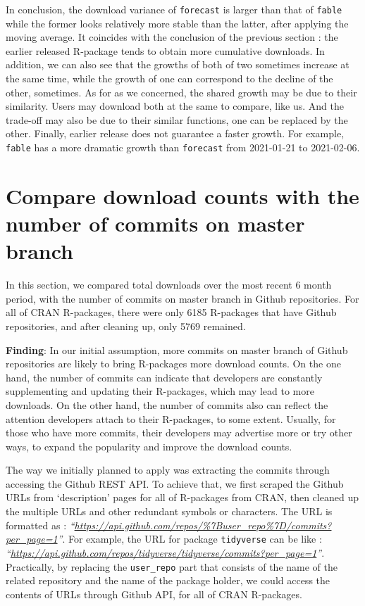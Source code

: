 \documentclass[
]{book}
\newenvironment{discovery}[1]{%
  \begin{tcolorbox}[colback=blue!30,colframe=blue!80!black]#1}{\end{tcolorbox}}
\begin{document}
In conclusion, the download variance of \texttt{forecast} is larger than that of \texttt{fable} while the former looks relatively more stable than the latter, after applying the moving average. It coincides with the conclusion of the previous section : the earlier released R-package tends to obtain more cumulative downloads. In addition, we can also see that the growths of both of two sometimes increase at the same time, while the growth of one can correspond to the decline of the other, sometimes. As for as we concerned, the shared growth may be due to their similarity. Users may download both at the same to compare, like us. And the trade-off may also be due to their similar functions, one can be replaced by the other. Finally, earlier release does not guarantee a faster growth. For example, \texttt{fable} has a more dramatic growth than \texttt{forecast} from 2021-01-21 to 2021-02-06.

\hypertarget{compare-download-counts-with-the-number-of-commits-on-master-branch}{%
\section{Compare download counts with the number of commits on master branch}\label{compare-download-counts-with-the-number-of-commits-on-master-branch}}

In this section, we compared total downloads over the most recent 6 month period, with the number of commits on master branch in Github repositories. For all of CRAN R-packages, there were only 6185 R-packages that have Github repositories, and after cleaning up, only 5769 remained.

\begin{discovery}
\textbf{Finding}: In our initial assumption, more commits on master
branch of Github repositories are likely to bring R-packages more
download counts. On the one hand, the number of commits can indicate
that developers are constantly supplementing and updating their
R-packages, which may lead to more downloads. On the other hand, the
number of commits also can reflect the attention developers attach to
their R-packages, to some extent. Usually, for those who have more
commits, their developers may advertise more or try other ways, to
expand the popularity and improve the download counts.
\end{discovery}

The way we initially planned to apply was extracting the commits through accessing the Github REST API\citep{githubapi}. To achieve that, we first scraped the Github URLs from `description' pages for all of R-packages from CRAN, then cleaned up the multiple URLs and other redundant symbols or characters. The URL is formatted as : \emph{``\url{https://api.github.com/repos/\%7Buser_repo\%7D/commits?per_page=1}''}. For example, the URL for package \texttt{tidyverse} can be like : \emph{``\url{https://api.github.com/repos/tidyverse/tidyverse/commits?per_page=1}''}. Practically, by replacing the \texttt{user\_repo} part that consists of the name of the related repository and the name of the package holder, we could access the contents of URLs through Github API, for all of CRAN R-packages.
\end{document}
